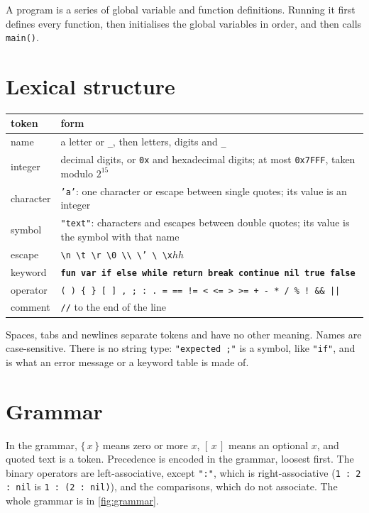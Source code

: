 \documentclass[11pt,a4paper]{article}
\newcommand{\kw}[1]{\textbf{\texttt{#1}}}
\newcommand{\tok}[1]{\texttt{"#1"}}
\newcommand{\hx}[1]{\texttt{0x#1}}
\begin{document}
A program is a series of global variable and function definitions. Running
it first defines every function, then initialises the global variables in
order, and then calls \texttt{main()}.

\section{Lexical structure}

\begin{center}
\small
\begin{tabularx}{\linewidth}{@{}l X@{}}
\toprule
token & form\\
\midrule
name & a letter or \texttt{\_}, then letters, digits and \texttt{\_}\\
integer & decimal digits, or \texttt{0x} and hexadecimal digits; at most \hx{7FFF}, taken modulo $2^{15}$\\
character & \texttt{'a'}: one character or escape between single quotes; its value is an integer\\
symbol & \texttt{"text"}: characters and escapes between double quotes; its value is the symbol with that name\\
escape & \texttt{\textbackslash n \textbackslash t \textbackslash r \textbackslash 0 \textbackslash\textbackslash{} \textbackslash' \textbackslash\textquotedbl{} \textbackslash x}$hh$\\
keyword & \kw{fun var if else while return break continue nil true false}\\
operator & \texttt{( ) \{ \} [ ] , ; : .\ = == != < <= > >= + - * / \% ! \&\& ||}\\
comment & \texttt{//} to the end of the line\\
\bottomrule
\end{tabularx}
\end{center}
Spaces, tabs and newlines separate tokens and have no other meaning. Names
are case-sensitive. There is no string type: \verb|"expected ;"| is a symbol,
like \verb|"if"|, and is what an error message or a keyword table is made of.

\section{Grammar}

In the grammar, $\{\,x\,\}$ means zero or more $x$, $[\,x\,]$ means an
optional $x$, and quoted text is a token. Precedence is encoded in the
grammar, loosest first. The binary operators are left-associative, except
\tok{:}, which is right-associative (\verb|1 : 2 : nil| is
\verb|1 : (2 : nil)|), and the comparisons, which do not associate. The
whole grammar is in \cref{fig:grammar}.
\end{document}
